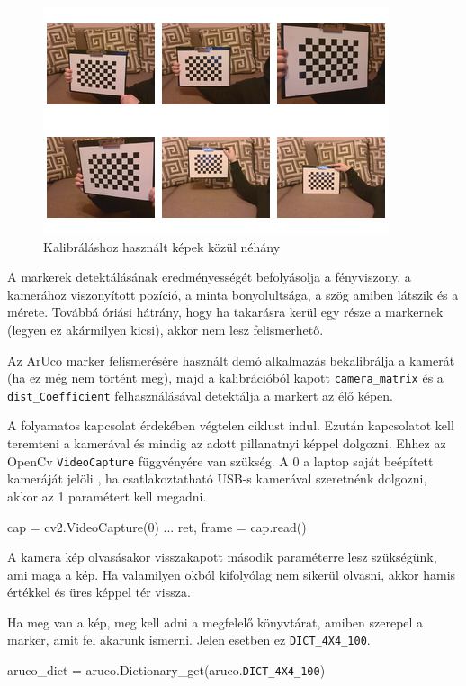 \begin{figure}[htp]
    \centering
   	\includegraphics[width=7truecm, height=6truecm]{images/calibration.jpg}
	\caption{Kalibráláshoz használt képek közül néhány}
\end{figure}



A markerek detektálásának eredményességét befolyásolja a fényviszony, a kamerához viszonyított pozíció, a minta bonyolultsága, a szög amiben látszik és a mérete. Továbbá óriási hátrány, hogy ha takarásra kerül egy része a markernek (legyen ez akármilyen kicsi), akkor nem lesz felismerhető.

Az ArUco marker felismerésére használt demó alkalmazás bekalibrálja a kamerát (ha ez még nem történt meg), majd a kalibrációból kapott \texttt{camera\_matrix} és a \texttt{dist\_Coefficient} felhasználásával detektálja a markert az élő képen.

A folyamatos kapcsolat érdekében végtelen ciklust indul.
Ezután kapcsolatot kell teremteni a kamerával és mindig az adott pillanatnyi képpel dolgozni.
Ehhez az OpenCv \texttt{VideoCapture} függvényére van szükség. A 0 a laptop saját beépített kameráját jelöli , ha csatlakoztatható USB-s kamerával szeretnénk dolgozni, akkor az 1 paramétert kell megadni.

\begin{python}
cap = cv2.VideoCapture(0)
...
ret, frame = cap.read()
\end{python}
A kamera kép olvasásakor visszakapott második paraméterre lesz szükségünk, ami maga a kép. Ha valamilyen okból kifolyólag nem sikerül olvasni, akkor hamis értékkel és üres képpel tér vissza.

Ha meg van a kép, meg kell adni a megfelelő könyvtárat, amiben szerepel a marker, amit fel akarunk ismerni. Jelen esetben ez  \texttt{DICT\_4X4\_100}.
\begin{python}
aruco_dict = aruco.Dictionary_get(aruco.\texttt{DICT\_4X4\_100})
\end{python}

